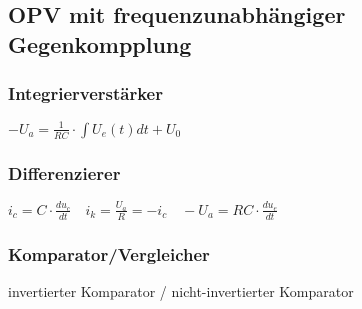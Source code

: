     \subsection{OPV mit frequenzunabhängiger Gegenkompplung}
    \begin{minipage}{0.5\columnwidth}
        \subsubsection{Integrierverstärker}
        $-U_a=\frac{1}{RC}\cdot \int U_e(t) dt+U_0$\\ %
    \end{minipage}
    \begin{minipage}{0.5\columnwidth}
        \subsubsection{Differenzierer}
        $i_c=C\cdot\frac{du_c}{dt}\quad i_k=\frac{U_a}{R}=-i_c\quad -U_a=RC\cdot\frac{du_e}{dt}$\\
    \end{minipage}
    \subsubsection{Komparator/Vergleicher}
    \begin{center}
        invertierter Komparator / nicht-invertierter Komparator
    \end{center}
